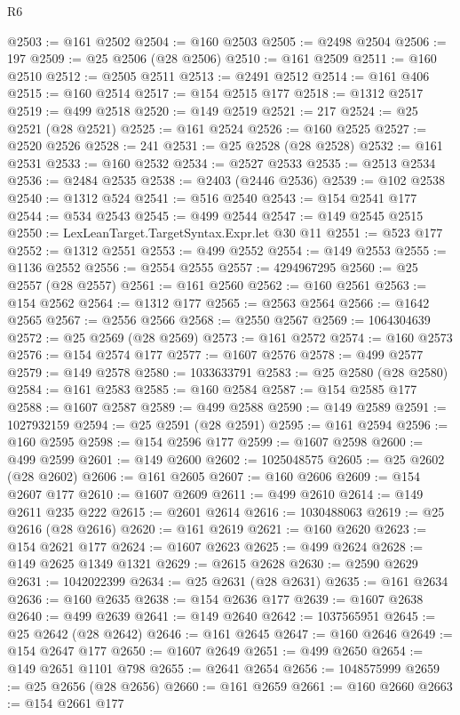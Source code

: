 \begin{lexlean}{R6}
\begin{coremodule}
@2503 := @161 @2502
@2504 := @160 @2503
@2505 := @2498 @2504
@2506 := 197
@2509 := @25 @2506 (@28 @2506)
@2510 := @161 @2509
@2511 := @160 @2510
@2512 := @2505 @2511
@2513 := @2491 @2512
@2514 := @161 @406
@2515 := @160 @2514
@2517 := @154 @2515 @177
@2518 := @1312 @2517
@2519 := @499 @2518
@2520 := @149 @2519
@2521 := 217
@2524 := @25 @2521 (@28 @2521)
@2525 := @161 @2524
@2526 := @160 @2525
@2527 := @2520 @2526
@2528 := 241
@2531 := @25 @2528 (@28 @2528)
@2532 := @161 @2531
@2533 := @160 @2532
@2534 := @2527 @2533
@2535 := @2513 @2534
@2536 := @2484 @2535
@2538 := @2403 (@2446 @2536)
@2539 := @102 @2538
@2540 := @1312 @524
@2541 := @516 @2540
@2543 := @154 @2541 @177
@2544 := @534 @2543
@2545 := @499 @2544
@2547 := @149 @2545 @2515
@2550 := LexLeanTarget.TargetSyntax.Expr.let @30 @11
@2551 := @523 @177
@2552 := @1312 @2551
@2553 := @499 @2552
@2554 := @149 @2553
@2555 := @1136 @2552
@2556 := @2554 @2555
@2557 := 4294967295
@2560 := @25 @2557 (@28 @2557)
@2561 := @161 @2560
@2562 := @160 @2561
@2563 := @154 @2562
@2564 := @1312 @177
@2565 := @2563 @2564
@2566 := @1642 @2565
@2567 := @2556 @2566
@2568 := @2550 @2567
@2569 := 1064304639
@2572 := @25 @2569 (@28 @2569)
@2573 := @161 @2572
@2574 := @160 @2573
@2576 := @154 @2574 @177
@2577 := @1607 @2576
@2578 := @499 @2577
@2579 := @149 @2578
@2580 := 1033633791
@2583 := @25 @2580 (@28 @2580)
@2584 := @161 @2583
@2585 := @160 @2584
@2587 := @154 @2585 @177
@2588 := @1607 @2587
@2589 := @499 @2588
@2590 := @149 @2589
@2591 := 1027932159
@2594 := @25 @2591 (@28 @2591)
@2595 := @161 @2594
@2596 := @160 @2595
@2598 := @154 @2596 @177
@2599 := @1607 @2598
@2600 := @499 @2599
@2601 := @149 @2600
@2602 := 1025048575
@2605 := @25 @2602 (@28 @2602)
@2606 := @161 @2605
@2607 := @160 @2606
@2609 := @154 @2607 @177
@2610 := @1607 @2609
@2611 := @499 @2610
@2614 := @149 @2611 @235 @222
@2615 := @2601 @2614
@2616 := 1030488063
@2619 := @25 @2616 (@28 @2616)
@2620 := @161 @2619
@2621 := @160 @2620
@2623 := @154 @2621 @177
@2624 := @1607 @2623
@2625 := @499 @2624
@2628 := @149 @2625 @1349 @1321
@2629 := @2615 @2628
@2630 := @2590 @2629
@2631 := 1042022399
@2634 := @25 @2631 (@28 @2631)
@2635 := @161 @2634
@2636 := @160 @2635
@2638 := @154 @2636 @177
@2639 := @1607 @2638
@2640 := @499 @2639
@2641 := @149 @2640
@2642 := 1037565951
@2645 := @25 @2642 (@28 @2642)
@2646 := @161 @2645
@2647 := @160 @2646
@2649 := @154 @2647 @177
@2650 := @1607 @2649
@2651 := @499 @2650
@2654 := @149 @2651 @1101 @798
@2655 := @2641 @2654
@2656 := 1048575999
@2659 := @25 @2656 (@28 @2656)
@2660 := @161 @2659
@2661 := @160 @2660
@2663 := @154 @2661 @177

\end{coremodule}
\end{lexlean}
